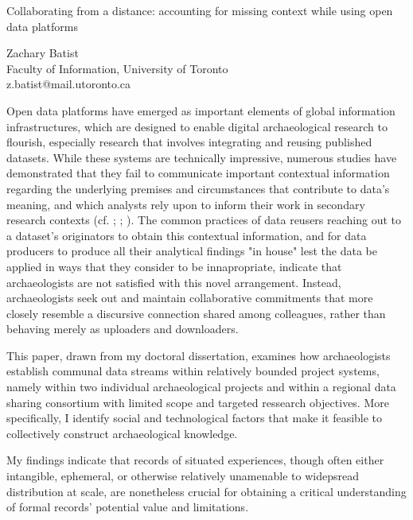 \documentclass[a4paper]{article}
\begin{document}

\large
\begin{center}
Collaborating from a distance: accounting for missing context while using open data platforms

\large
Zachary Batist\\

\small  
Faculty of Information, University of Toronto\\
z.batist@mail.utoronto.ca\\

\end{center}

\normalsize

Open data platforms have emerged as important elements of global information infrastructures, which are designed to enable digital archaeological research to flourish, especially research that involves integrating and reusing published datasets. While these systems are technically impressive, numerous studies have demonstrated that they fail to communicate important contextual information regarding the underlying premises and circumstances that contribute to data's meaning, and which analysts rely upon to inform their work in secondary research contexts (cf. \cite{faniel2013}; \cite{opitz2021}; \cite{huggett2022}). The common practices of data reusers reaching out to a dataset's originators to obtain this contextual information, and for data producers to produce all their analytical findings "in house" lest the data be applied in ways that they consider to be innapropriate, indicate that archaeologists are not satisfied with this novel arrangement. Instead, archaeologists seek out and maintain collaborative commitments that more closely resemble a discursive connection shared among colleagues, rather than behaving merely as uploaders and downloaders.

This paper, drawn from my doctoral dissertation, examines how archaeologists establish communal data streams within relatively bounded project systems, namely within two individual archaeological projects and within a regional data sharing consortium with limited scope and targeted ressearch objectives. More specifically, I identify social and technological factors that make it feasible to collectively construct archaeological knowledge.

My findings indicate that records of situated experiences, though often either intangible, ephemeral, or otherwise relatively unamenable to widepsread distribution at scale, are nonetheless crucial for obtaining a critical understanding of formal records' potential value and limitations.
\end{document}
